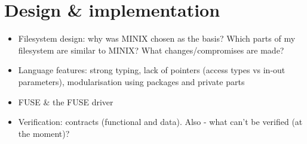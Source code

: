 \section{Design \& implementation}
\begin{itemize}
  \item Filesystem design: why was MINIX chosen as the basis? Which parts of my filesystem are similar to MINIX? What changes/compromises are made?
  \item Language features: strong typing, lack of pointers (access types vs in-out parameters), modularisation using packages and private parts
  \item FUSE \& the FUSE driver
  \item Verification: contracts (functional and data). Also - what can't be verified (at the moment)?
\end{itemize}
